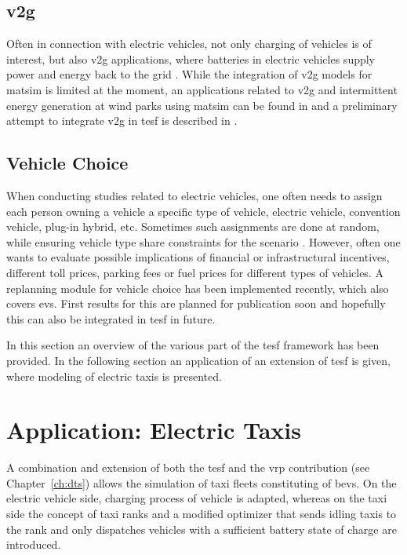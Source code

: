 \subsection{\protect\gls{v2g}}
Often in connection with electric vehicles, not only charging of vehicles is of interest, but also \gls{v2g} applications, where batteries in electric vehicles supply power and energy back to the grid \citep[][]{KemptonTomic_JPS_2005}. While the integration of \gls{v2g} models for \gls{matsim} is limited at the moment, an applications related to \gls{v2g} and intermittent energy generation at wind parks using \gls{matsim} can be found in \citet[][]{GalusAndersson_CIGRE_2011} and a preliminary attempt to integrate \gls{v2g} in \gls{tesf} is described in \citet[][]{WaraichEtAl_JanssensEtAl_2014, Schieffer_MastersThesis_2011}.

\subsection{Vehicle Choice}
When conducting studies related to electric vehicles, one often needs to assign each person owning a vehicle a specific type of vehicle, \eg electric vehicle, convention vehicle, plug-in hybrid, etc. Sometimes such assignments are done at random, while ensuring vehicle type share constraints for the scenario \citep[e.g.,][]{WaraichEtAl_JanssensEtAl_2014}. However, often one wants to evaluate possible implications of financial or infrastructural incentives, \eg different toll prices, parking fees or fuel prices for different types of vehicles. A replanning module for vehicle choice has been implemented recently, which also covers \glspl{ev}. First results for this are planned for publication soon and hopefully this can also be integrated in \gls{tesf} in future.

In this section an overview of the various part of the \gls{tesf} framework has been provided. In the following section an application of an extension of \gls{tesf} is given, where modeling of electric taxis is presented.

\section{Application: Electric Taxis} %
A combination and extension of both the \gls{tesf} and the \gls{vrp} contribution (see Chapter~\ref{ch:dts}) allows the simulation of taxi fleets constituting of \glspl{bev}.
On the electric vehicle side, charging process of vehicle is adapted, whereas on the taxi side the concept of taxi ranks and a modified optimizer that sends idling taxis to the rank and only dispatches vehicles with a sufficient battery state of charge are introduced. 

